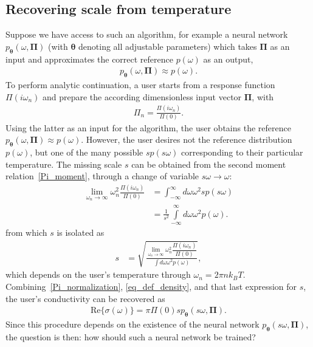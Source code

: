 \documentclass[notitlepage,11pt,nofootinbib]{revtex4-1}
\renewcommand{\vec}[1]{\bm{#1}}
\begin{document}
\subsection{Recovering scale from temperature}
\label{sec_usage}
Suppose we have access to such an algorithm, for example a neural network $p_{\vec\theta}(\omega,\vec\Pi)$ (with $\vec \theta$ denoting all adjustable parameters) which takes $\vec \Pi$ as an input and approximates the correct reference $p(\omega)$ as an output,
\begin{align}
p_{\vec\theta}(\omega,\vec \Pi)\approx p(\omega).
\end{align}
To perform analytic continuation, a user starts from a response function $\Pi(i\omega_n)$ and prepare the according dimensionless input vector $\vec \Pi$, with
\begin{align}
\Pi_n = \frac{\Pi(i\omega_n)}{\Pi(0)}.
\end{align}
Using the latter as an input for the algorithm, the user obtains the reference $p_{\vec\theta}(\omega,\vec \Pi)\approx p(\omega)$. However, the user desires not the reference distribution $p(\omega)$, but one of the many possible $sp(s\omega)$ corresponding to their particular temperature. The missing scale $s$ can be obtained from the second moment relation~\eqref{Pi_moment}, through a change of variable $s\omega\rightarrow \omega$:
\begin{align}
\lim_{\omega_n\rightarrow\infty}\omega_n^2
\frac{\Pi(i\omega_n)}{\Pi(0)}
&=
\int_{-\infty}^{\infty}d\omega \omega^2 sp(s\omega)
\\
&=
\frac{1}{s^2}
\int\limits_{-\infty}^{\infty}d\omega \omega^2 p(\omega).
\end{align}
from which $s$ is isolated as 
\begin{align}
s
&=
\sqrt{
\frac{
\lim\limits_{\omega_n\rightarrow\infty}\omega_n^2
\dfrac{\Pi(i\omega_n)}{\Pi(0)}
}{
\int d\omega \omega^2 p(\omega)
}},
\label{user_s}
\end{align}
which depends on the user's temperature through $\omega_n = 2\pi n k_B T$. Combining~\eqref{Pi_normalization}, \eqref{eq_def_density}, and that last expression for $s$, the user's conductivity can be recovered as
\begin{align}
\text{Re}\{ \sigma(\omega) \} = \pi\Pi(0) 
s p_{\vec \theta}(s\omega, \vec \Pi).
\end{align}
Since this procedure depends on the existence of the neural network $p_{\vec \theta}(s\omega, \vec \Pi)$, the question is then: how should such a neural network be trained?
\end{document}
